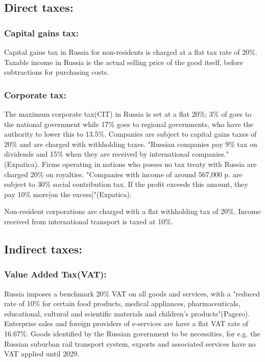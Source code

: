 \documentclass[12pt, a4paper]{article}
\begin{document}
		\subsection{Direct taxes:}
		\subsubsection{Capital gains tax:}
		Capital gains tax in Russia for non-residents is charged at a flat tax rate of 20\%. Taxable income in Russia is the actual selling price of the good itself, before subtractions for purchasing costs.
		\subsubsection{Corporate tax:}
		The maximum corporate tax(CIT) in Russia is set at a flat 20\%; 3\% of goes to the national government while 17\% goes to regional governments, who have the authority to lower this to 13.5\%. Companies are subject to capital gains taxes of 20\% and are charged with withholding taxes. "Russian companies pay 9\% tax on dividends and 15\% when they are received by international companies."(Expatica). Firms operating in nations who posses no tax treaty with Russia are charged 20\% on royalties. "Companies with income of around 567,000 p. are subject to 30\% social contribution tax. If the profit exceeds this amount, they pay 10\% more[on the excess]"(Expatica).
		\newline
		
		Non-resident corporations are charged with a flat withholding tax of 20\%. Income received from international transport is taxed at 10\%. 
		\subsection{Indirect  taxes:}
		\subsubsection{Value Added Tax(VAT):}
		Russia imposes a benchmark 20\% VAT on all goods and services, with a "reduced rate of 10\% for certain food products, medical appliances, pharmaceuticals, educational, cultural and scientific materials and children’s products"(Pagero). Enterprise sales and foreign providers of e-services are have a flat VAT rate of 16.67\%. Goods identified by the Russian government to be necessities, for e.g. the Russian suburban rail transport system, exports and associated services have no VAT applied until 2029. 
\end{document}
